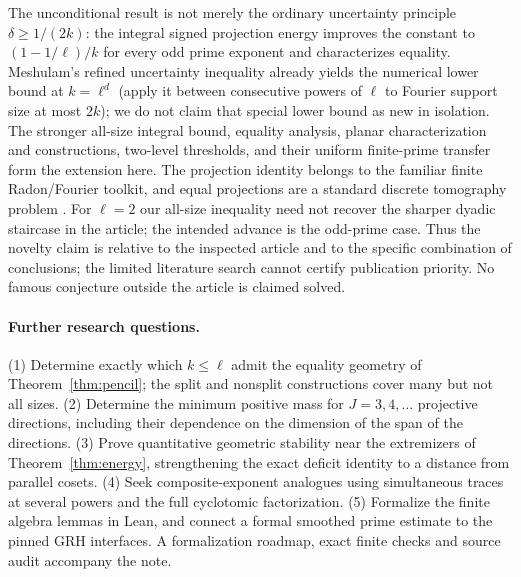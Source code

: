 \documentclass[11pt]{article}
\theoremstyle{remark}\newtheorem{remark}[theorem]{Remark}
\newcommand{\1}{\mathbf 1}
\begin{document}
The unconditional result is not merely the ordinary uncertainty principle $\delta\ge1/(2k)$: the integral signed projection energy improves the constant to $(1-1/\ell)/k$ for every odd prime exponent and characterizes equality. Meshulam's refined uncertainty inequality \cite{meshulam} already yields the numerical lower bound at $k=\ell^d$ (apply it between consecutive powers of $\ell$ to Fourier support size at most $2k$); we do not claim that special lower bound as new in isolation. The stronger all-size integral bound, equality analysis, planar characterization and constructions, two-level thresholds, and their uniform finite-prime transfer form the extension here. The projection identity belongs to the familiar finite Radon/Fourier toolkit, and equal projections are a standard discrete tomography problem \cite{tomography,fraser}. For $\ell=2$ our all-size inequality need not recover the sharper dyadic staircase in the article; the intended advance is the odd-prime case. Thus the novelty claim is relative to the inspected article and to the specific combination of conclusions; the limited literature search cannot certify publication priority. No famous conjecture outside the article is claimed solved.

\paragraph{Further research questions.}
(1) Determine exactly which $k\le\ell$ admit the equality geometry of Theorem~\ref{thm:pencil}; the split and nonsplit constructions cover many but not all sizes. (2) Determine the minimum positive mass for $J=3,4,\ldots$ projective directions, including their dependence on the dimension of the span of the directions. (3) Prove quantitative geometric stability near the extremizers of Theorem~\ref{thm:energy}, strengthening the exact deficit identity to a distance from parallel cosets. (4) Seek composite-exponent analogues using simultaneous traces at several powers and the full cyclotomic factorization. (5) Formalize the finite algebra lemmas in Lean, and connect a formal smoothed prime estimate to the pinned GRH interfaces. A formalization roadmap, exact finite checks and source audit accompany the note.
\end{document}
